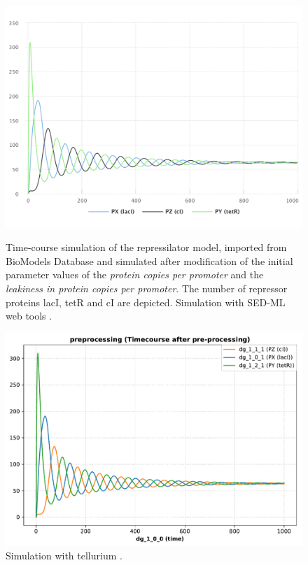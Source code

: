 \begin{figure}[ht]
    \centering
    \begin{minipage}{0.47\textwidth}
        \centering
        \includegraphics[width=1.0\textwidth]{examples/repressilator/results/sedml_webtools/preprocessing}
        \caption{Time-course simulation of the repressilator model, imported from BioModels Database and simulated after modification of the initial parameter values of the \emph{protein copies per promoter} and the \emph{leakiness in protein copies per promoter}. The number of repressor proteins lacI, tetR and cI are depicted. Simulation with SED-ML web tools \citep{bergmann2017sed}.}
    \end{minipage}\hfill
    \begin{minipage}{0.47\textwidth}
        \centering
        \includegraphics[width=1.0\textwidth]{examples/repressilator/results/tellurium/preprocessing}
        \caption{Simulation with tellurium \citep{tellurium}.}
    \end{minipage}
    \label{fig:rep_pre}
\end{figure}


